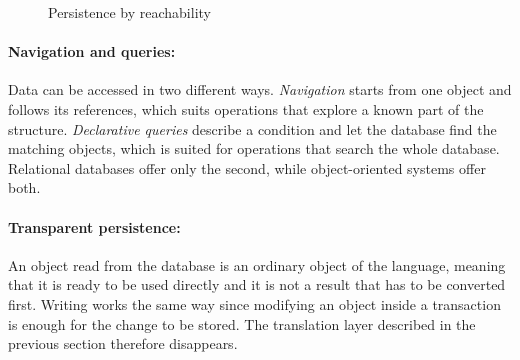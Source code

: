\documentclass{article}
\begin{document}
\begin{figure}[htbp]
    \centering
    \caption{Persistence by reachability}
    \label{fig:reachability}
\end{figure}

\paragraph{Navigation and queries:} Data can be accessed in two different
ways. \emph{Navigation} starts from one object and follows its references, which
suits operations that explore a known part of the structure. \emph{Declarative
queries} describe a condition and let the database find the matching objects,
which is suited for operations that search the whole database. Relational databases offer
only the second, while object-oriented systems offer both.

\paragraph{Transparent persistence:} An object read from the database is an
ordinary object of the language, meaning that it is ready to be used directly and it is not a result that
has to be converted first. Writing works the same way since modifying an object
inside a transaction is enough for the change to be stored. The translation layer
described in the previous section therefore disappears.
\end{document}
